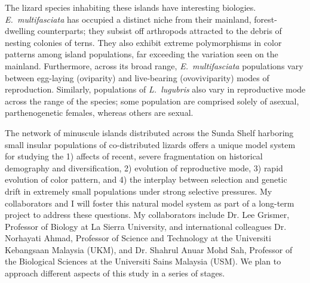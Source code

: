 \documentclass[10pt]{article}
\begin{document}
The lizard species inhabiting these islands have interesting biologies.
\emph{E.\ multifasciata} has occupied a distinct niche from their mainland,
forest-dwelling counterparts; they subsist off arthropods attracted to the
debris of nesting colonies of terns.
They also exhibit extreme polymorphisms in color patterns among island
populations, far exceeding the variation seen on the mainland.
Furthermore, across its broad range, \emph{E.\ multifasciata} populations vary
between egg-laying (oviparity) and live-bearing (ovoviviparity) modes of
reproduction.
Similarly, populations of \emph{L.\ lugubris} also vary in reproductive mode
across the range of the species; some population are comprised solely of
asexual, parthenogenetic females, whereas others are sexual.

The network of minuscule islands distributed across the Sunda Shelf harboring
small insular populations of co-distributed lizards offers a unique model
system for studying the 
1) affects of recent, severe fragmentation on historical demography and
diversification,
2) evolution of reproductive mode,
3) rapid evolution of color pattern, and 
4) the interplay between selection and genetic drift in extremely small
populations under strong selective pressures.
My collaborators and I will foster this natural model system as part of a
long-term project to address these questions.
My collaborators include
Dr. Lee Grismer, Professor of Biology at La Sierra University, and
international colleagues
Dr. Norhayati Ahmad, Professor of Science and Technology at the Universiti
Kebangsaan Malaysia (UKM), and
Dr. Shahrul Anuar Mohd Sah, Professor of the Biological Sciences at the
Universiti Sains Malaysia (USM).
We plan to approach different aspects of this study in a series of stages.
\end{document}
